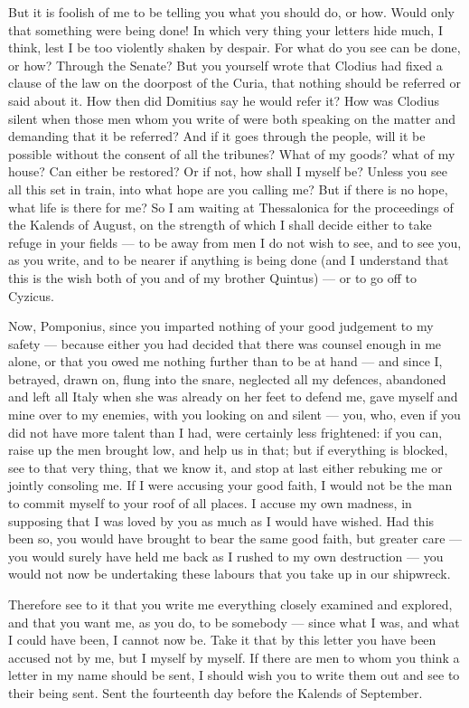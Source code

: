  But it is foolish of me to be telling you what you should do, or how. Would only that something were being done! In which very thing your letters hide much, I think, lest I be too violently shaken by despair. For what do you see can be done, or how? Through the Senate? But you yourself wrote that Clodius had fixed a clause of the law on the doorpost of the Curia, that nothing should be referred or said about it. How then did Domitius say he would refer it? How was Clodius silent when those men whom you write of were both speaking on the matter and demanding that it be referred? And if it goes through the people, will it be possible without the consent of all the tribunes? What of my goods? what of my house? Can either be restored? Or if not, how shall I myself be? Unless you see all this set in train, into what hope are you calling me? But if there is no hope, what life is there for me? So I am waiting at Thessalonica for the proceedings of the Kalends of August, on the strength of which I shall decide either to take refuge in your fields --- to be away from men I do not wish to see, and to see you, as you write, and to be nearer if anything is being done (and I understand that this is the wish both of you and of my brother Quintus) --- or to go off to Cyzicus.

 Now, Pomponius, since you imparted nothing of your good judgement to my safety --- because either you had decided that there was counsel enough in me alone, or that you owed me nothing further than to be at hand --- and since I, betrayed, drawn on, flung into the snare, neglected all my defences, abandoned and left all Italy when she was already on her feet to defend me, gave myself and mine over to my enemies, with you looking on and silent --- you, who, even if you did not have more talent than I had, were certainly less frightened: if you can, raise up the men brought low, and help us in that; but if everything is blocked, see to that very thing, that we know it, and stop at last either rebuking me or jointly consoling me. If I were accusing your good faith, I would not be the man to commit myself to your roof of all places. I accuse my own madness, in supposing that I was loved by you as much as I would have wished. Had this been so, you would have brought to bear the same good faith, but greater care --- you would surely have held me back as I rushed to my own destruction --- you would not now be undertaking these labours that you take up in our shipwreck.

 Therefore see to it that you write me everything closely examined and explored, and that you want me, as you do, to be somebody --- since what I was, and what I could have been, I cannot now be. Take it that by this letter you have been accused not by me, but I myself by myself. If there are men to whom you think a letter in my name should be sent, I should wish you to write them out and see to their being sent. Sent the fourteenth day before the Kalends of September.
